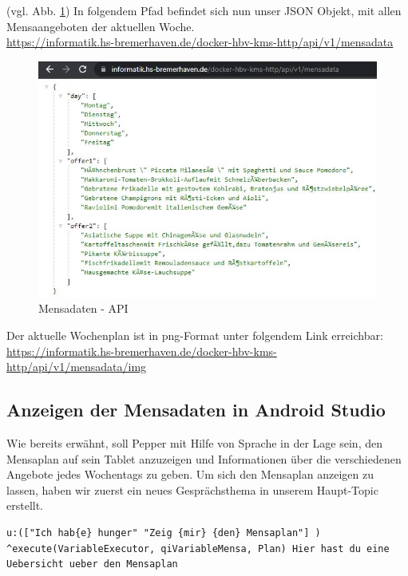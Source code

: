 (vgl. Abb. \ref{fig:mensaapi}) In folgendem Pfad befindet sich nun unser JSON Objekt, mit allen Mensaangeboten der aktuellen Woche.\\
\url{https://informatik.hs-bremerhaven.de/docker-hbv-kms-http/api/v1/mensadata}
\\
\begin{figure}[H]
    \centering
    \includegraphics[width=13cm]{Figures/AppChapter/mensa_5.JPG}
    \caption{Mensadaten - API}
    \label{fig:mensaapi}
    \centering
\end{figure}

Der aktuelle Wochenplan ist in png-Format unter folgendem Link erreichbar:\\
\url{https://informatik.hs-bremerhaven.de/docker-hbv-kms-http/api/v1/mensadata/img}\\


\subsection{Anzeigen der Mensadaten in Android Studio}

Wie bereits erwähnt, soll Pepper mit Hilfe von Sprache in der Lage sein, den Mensaplan auf sein Tablet anzuzeigen und Informationen 
über die verschiedenen Angebote jedes Wochentags zu geben. Um sich den Mensaplan anzeigen zu lassen, haben wir zuerst ein neues 
Gesprächsthema in unserem Haupt-Topic erstellt. 
\\
\begin{lstlisting}
u:(["Ich hab{e} hunger" "Zeig {mir} {den} Mensaplan"] ) 
^execute(VariableExecutor, qiVariableMensa, Plan) Hier hast du eine 
Uebersicht ueber den Mensaplan
\end{lstlisting}

